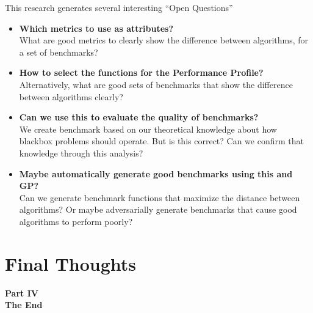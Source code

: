 \documentclass[aspectratio=169]{beamer}
\begin{document}
\begin{frame}{This research generates several interesting ``Open Questions''}
  \begin{itemize}
  \item {\bf Which metrics to use as attributes?}\\
    What are good metrics to clearly show the difference between
    algorithms, for a set of benchmarks?

  \item {\bf How to select the functions for the Performance Profile?}\\
    Alternatively, what are good sets of benchmarks that show the
    difference between algorithms clearly?

  \item {\bf Can we use this to evaluate the quality of benchmarks?}\\
    We create benchmark based on our theoretical knowledge about how
    blackbox problems should operate. But is this correct? Can we
    confirm that knowledge through this analysis?


  \item {\bf Maybe automatically generate good benchmarks using this
    and GP?}\\
    Can we generate benchmark functions that maximize the distance
    between algorithms? Or maybe adversarially generate benchmarks
    that cause good algorithms to perform poorly?
  \end{itemize}
\end{frame}


\section{Final Thoughts}

\begin{frame}
  \begin{center}
  {\large{\bf
  Part IV\\
  The End
  }}
  \end{center}
\end{frame}
\end{document}
